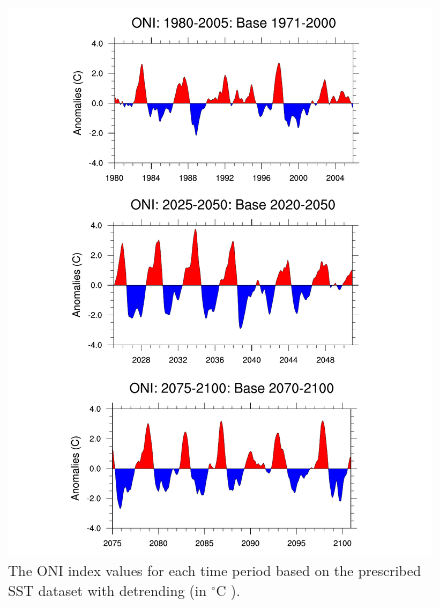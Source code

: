\documentclass{ametsoc}
\begin{document}
\begin{figure}
\begin{center}
\includegraphics[width=6in]{indices_oni.pdf}
\caption{The ONI index values for each time period based on the prescribed SST dataset with detrending (in $^\circ$C ).}
\end{center}
\label{fig:S5}
\end{figure}

\end{document}
